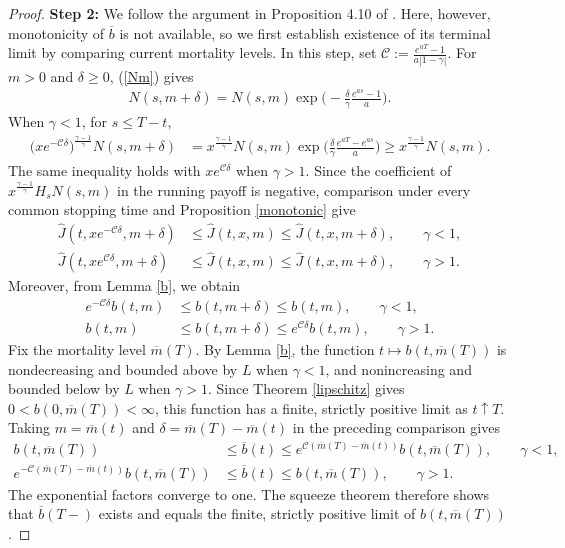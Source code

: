 \documentclass[a4paper,11pt]{amsart}
\numberwithin{equation}{section}
\begin{document}
{{{\begin{proof}
\textbf{Step 2:} We follow the argument in Proposition 4.10 of \citet{de2019free}. Here, however, monotonicity of $\overline b$ is not available, so we first establish existence of its terminal limit by comparing current mortality levels. In this step, set $\mathcal C:=\frac{e^{aT}-1}{a|1-\gamma|}$. For $m>0$ and $\delta\geq0$, (\ref{Nm}) gives
\begin{align*}
N(s,m+\delta)=N(s,m)\exp\bigg(-\frac{\delta}{\gamma}\frac{e^{as}-1}{a}\bigg).
\end{align*}
When $\gamma<1$, for $s\leq T-t$,
\begin{align*}
\big(xe^{-\mathcal C\delta}\big)^{\frac{\gamma-1}{\gamma}}N(s,m+\delta)
&=x^{\frac{\gamma-1}{\gamma}}N(s,m)\exp\bigg(\frac{\delta}{\gamma}\frac{e^{aT}-e^{as}}{a}\bigg)
\geq x^{\frac{\gamma-1}{\gamma}}N(s,m).
\end{align*}
The same inequality holds with $xe^{\mathcal C\delta}$ when $\gamma>1$. Since the coefficient of $x^{\frac{\gamma-1}{\gamma}}H_sN(s,m)$ in the running payoff is negative, comparison under every common stopping time and Proposition \ref{monotonic} give
\begin{align*}
\widehat J(t,xe^{-\mathcal C\delta},m+\delta)&\leq\widehat J(t,x,m)\leq\widehat J(t,x,m+\delta),\qquad\gamma<1,\\
\widehat J(t,xe^{\mathcal C\delta},m+\delta)&\leq\widehat J(t,x,m)\leq\widehat J(t,x,m+\delta),\qquad\gamma>1.
\end{align*}
Moreover, from Lemma \ref{b}, we obtain
\begin{align*}
e^{-\mathcal C\delta}b(t,m)&\leq b(t,m+\delta)\leq b(t,m),\qquad\gamma<1,\\
b(t,m)&\leq b(t,m+\delta)\leq e^{\mathcal C\delta}b(t,m),\qquad\gamma>1.
\end{align*}
Fix the mortality level $\overline m(T)$. By Lemma \ref{b}, the function $t\mapsto b(t,\overline m(T))$ is nondecreasing and bounded above by $L$ when $\gamma<1$, and nonincreasing and bounded below by $L$ when $\gamma>1$. Since Theorem \ref{lipschitz} gives $0<b(0,\overline m(T))<\infty$, this function has a finite, strictly positive limit as $t\uparrow T$. Taking $m=\overline m(t)$ and $\delta=\overline m(T)-\overline m(t)$ in the preceding comparison gives
\begin{align*}
b(t,\overline m(T))&\leq\overline b(t)\leq e^{\mathcal C(\overline m(T)-\overline m(t))}b(t,\overline m(T)),\qquad\gamma<1,\\
e^{-\mathcal C(\overline m(T)-\overline m(t))}b(t,\overline m(T))&\leq\overline b(t)\leq b(t,\overline m(T)),\qquad\gamma>1.
\end{align*}
The exponential factors converge to one. The squeeze theorem therefore shows that $\overline b(T-)$ exists and equals the finite, strictly positive limit of $b(t,\overline m(T))$.













\end{proof}}}}
\end{document}
